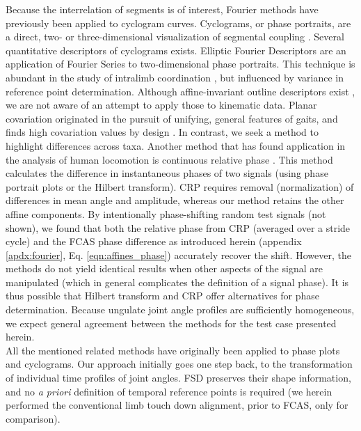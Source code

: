 Because the interrelation of segments is of interest, Fourier methods have previously been applied to cyclogram curves.
Cyclograms, or phase portraits, are a direct, two- or three-dimensional visualization of segmental coupling \citep{Bernstein1934,Goswami1998,DAout2002}.
Several quantitative descriptors of cyclograms exists.
Elliptic Fourier Descriptors \citep{Kuhl1982,Wheat2006} are an application of Fourier Series to two-dimensional phase portraits.
This technique is abundant in the study of intralimb coordination \cite[e.g.][]{Polk2008,HsiaoWecksler2010,Rosengren2009}, but influenced by variance in reference point determination.
Although affine-invariant outline descriptors exist \cite[e.g.][]{Arbter1990}, we are not aware of an attempt to apply those to kinematic data.
Planar covariation \citep{Borghese1996,Hallemans2009,Ogihara2014} originated in the pursuit of unifying, general features of gaits, and finds high covariation values by design \cite[choice of segment angles, common temporal swing/stance structure for these, use of PCA;][]{Hicheur2006,Ivanenko2008}.
In contrast, we seek a method to highlight differences across taxa.
Another method that has found application in the analysis of human locomotion is continuous relative phase \cite[CRP, \textit{cf.}][]{Lamb2014}.
This method calculates the difference in instantaneous phases of two signals (using phase portrait plots or the Hilbert transform).
CRP requires removal (normalization) of differences in mean angle and amplitude, whereas our method retains the other affine components.
By intentionally phase-shifting random test signals (not shown), we found that both the relative phase from CRP (averaged over a stride cycle) and the FCAS phase difference as introduced herein (appendix \ref*{apdx:fourier}, Eq. \ref*{eqn:affines_phase}) accurately recover the shift.
However, the methods do not yield identical results when other aspects of the signal are manipulated (which in general complicates the definition of a signal phase).
It is thus possible that Hilbert transform and CRP offer alternatives for phase determination.
Because ungulate joint angle profiles are sufficiently homogeneous, we expect general agreement between the methods for the test case presented herein.
\\All the mentioned related methods have originally been applied to phase plots and cyclograms.
Our approach initially goes one step back, to the transformation of individual time profiles of joint angles.
FSD preserves their shape information, and no \textit{a priori} definition of temporal reference points is required (we herein performed the conventional limb touch down alignment, prior to FCAS, only for comparison).
